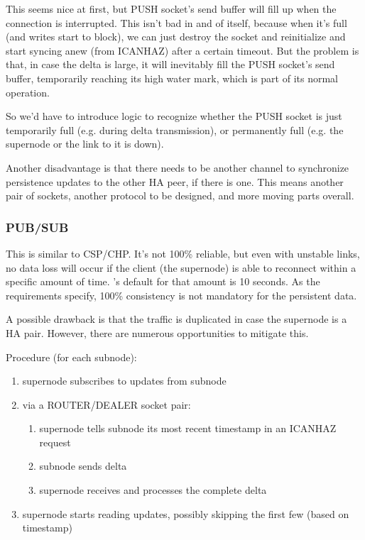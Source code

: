 This seems nice at first, but PUSH socket's send buffer will fill up when the
connection is interrupted.  This isn't bad in and of itself, because when it's
full (and writes start to block), we can just destroy the socket and
reinitialize and start syncing anew (from ICANHAZ) after a certain timeout.
But the problem is that, in case the delta is large, it will inevitably fill
the PUSH socket's send buffer, temporarily reaching its high water mark, which
is part of its normal operation.

So we'd have to introduce logic to recognize whether the PUSH
socket is just temporarily full (e.g. during delta transmission), or
permanently full (e.g. the supernode or the link to it is down).

Another disadvantage is that there needs to be another channel to synchronize
persistence updates to the other HA peer, if there is one. This means another
pair of sockets, another protocol to be designed, and more moving parts
overall.

\subsubsection{PUB/SUB}
This is similar to CSP/CHP. It's not 100\% reliable, but even with unstable
links, no data loss will occur if the client (the supernode) is able to reconnect within a
specific amount of time. \zmq's default for that amount is 10 seconds. As the
requirements specify, 100\% consistency is not mandatory for the persistent
data.

A possible drawback is that the traffic is duplicated in case the supernode
is a HA pair. However, there are numerous opportunities to mitigate this.

Procedure (for each subnode):
\begin{enumerate}
	\item supernode subscribes to updates from subnode
	\item via a ROUTER/DEALER socket pair:
		\begin{enumerate}
			\item supernode tells subnode its most recent timestamp in an ICANHAZ request
			\item subnode sends delta
			\item supernode receives and processes the complete delta
		\end{enumerate}
	\item supernode starts reading updates, possibly skipping the first few (based on timestamp)
\end{enumerate}

